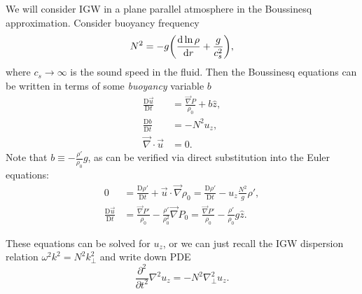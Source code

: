 \documentclass[11pt,
        usenames, %
        dvipsnames %
    ]{article}
\newcommand*{\rd}[2]{\frac{\mathrm{d}#1}{\mathrm{d}#2}}
\newcommand*{\ptd}[2]{\frac{\partial^2 #1}{\partial#2^2}}
\newcommand*{\md}[2]{\frac{\mathrm{D}#1}{\mathrm{D}#2}}
\DeclarePairedDelimiter\p{\lparen}{\rparen}
\begin{document}
We will consider IGW in a plane parallel atmosphere in the Boussinesq
approximation. Consider buoyancy frequency
\begin{equation}
    N^2 = -g\p*{\rd{\ln \rho}{r} + \frac{g}{c_s^2}},
\end{equation}
where $c_s \to \infty$ is the sound speed in the fluid. Then the Boussinesq
equations can be written in terms of some \emph{buoyancy} variable $b$
\begin{subequations}\label{eq:bouss}
    \begin{align}
        \md{\vec{u}}{t} &= \frac{\vec{\nabla}P}{\rho_0} + b\hat{z},\\
        \md{b}{t} &= -N^2 u_z,\\
        \vec{\nabla} \cdot \vec{u} &= 0.
    \end{align}
\end{subequations}
Note that $b \equiv -\frac{\rho'}{\rho_0} g$, as can be verified via
direct substitution into the Euler equations:
\begin{subequations}\label{eq:bouss}
    \begin{align}
        0 &= \md{\rho'}{t} + \vec{u} \cdot \vec{\nabla}\rho_0 =
            \md{\rho'}{t} - u_z \frac{N^2}{g} \rho',\\
        \md{\vec{u}}{t} &= \frac{\vec{\nabla}P'}{\rho_0}
                - \frac{\rho'}{\rho_0^2} \vec{\nabla} P_0
            = \frac{\vec{\nabla}P'}{\rho_0} - \frac{\rho'}{\rho_0}g\hat{z}.
    \end{align}
\end{subequations}

These equations can be solved for $u_z$, or we can just recall the IGW
dispersion relation $\omega^2 k^2 = N^2k_{\perp}^2$ and write down PDE
\begin{equation}
    \ptd{}{t} \nabla^2 u_z = -N^2\nabla_{\perp}^2 u_z.\label{eq:igw_pde}
\end{equation}
\end{document}
